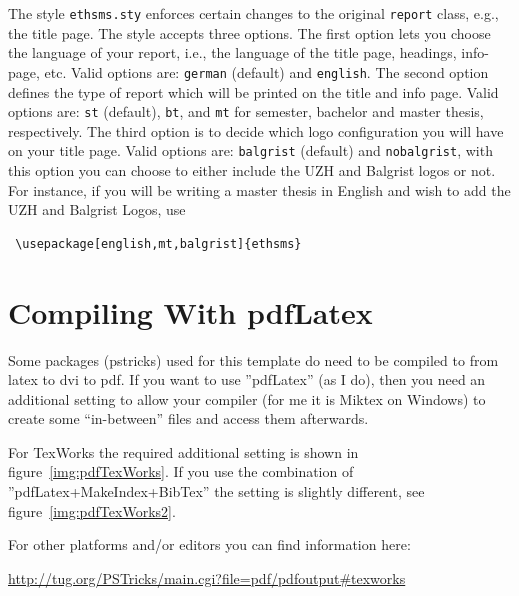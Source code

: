 The style \texttt{ethsms.sty} enforces certain changes to the original \texttt{report} class, e.g., the title page. The style accepts three options. The first option lets you choose the language of your report, i.e., the language of the title page, headings, info-page, etc. Valid options are: \texttt{german} (default) and \texttt{english}. The second option defines the type of report which will be printed on the title and info page. Valid options are: \texttt{st} (default), \texttt{bt}, and \texttt{mt} for semester, bachelor and master thesis, respectively. The third option is to decide which logo configuration you will have on your title page.
Valid options are:  \texttt{balgrist} (default) and  \texttt{nobalgrist}, with this option you can choose to either include the UZH and Balgrist logos or not.
For instance, if you will be writing a master thesis in English and wish to add the UZH and Balgrist Logos, use
\begin{verbatim}
 \usepackage[english,mt,balgrist]{ethsms}
\end{verbatim}



\section{Compiling With pdfLatex}\label{sec:pdfLatex}

Some packages (pstricks) used for this template do need to be compiled to from latex to dvi to pdf.
If you want to use ''pdfLatex'' (as I do), then you need an additional setting to allow your compiler (for me it is Miktex on Windows) to create some ``in-between'' files and access them afterwards.

For TexWorks the required additional setting is shown in figure~\ref{img:pdfTexWorks}.
If you use the combination of ''pdfLatex+MakeIndex+BibTex'' the setting is slightly different, see figure~\ref{img:pdfTexWorks2}.

For other platforms and/or editors you can find information here: 

\url{http://tug.org/PSTricks/main.cgi?file=pdf/pdfoutput#texworks}

